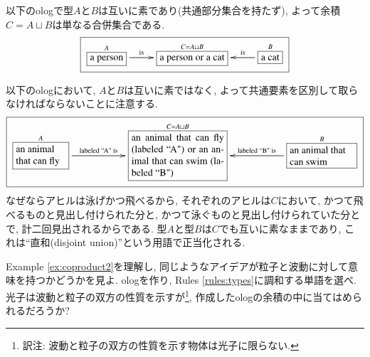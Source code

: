 \begin{example}\label{ex:coproduct1}


以下のologで型$A$と$B$は互いに素であり(共通部分集合を持たず), よって余積$C=A\sqcup B$は単なる合併集合である. $$\fbox{\xymatrix{\smbox{A}{a person}\LA{r}{is}&\smbox{C=A\sqcup B}{a person or a cat}&\smbox{B}{a cat}\LAL{l}{is}}}$$
\end{example}

\begin{example}\label{ex:coproduct2}


以下のologにおいて, $A$と$B$は互いに素ではなく, よって共通要素を区別して取らなければならないことに注意する. $$\fbox{\xymatrixnocompile{\obox{A}{.7in}{\rr an animal that can fly}\LA{rr}{labeled ``A" is}&&\obox{C=A\sqcup B}{1.3in}{an animal that can fly (labeled ``A") or an animal that can swim (labeled ``B")}&&\obox{B}{.9in}{\rr an animal that can swim}\LAL{ll}{labeled ``B" is}}}$$ なぜならアヒルは泳げかつ飛べるから, それぞれのアヒルは$C$において, かつて飛べるものと見出し付けられた分と, かつて泳ぐものと見出し付けられていた分とで, 計二回見出されるからである. 型$A$と型$B$は$C$でも互いに素なままであり, これは``直和(disjoint union)''という用語で正当化される.

\end{example}

\begin{exercise}


Example \ref{ex:coproduct2}を理解し, 同じようなアイデアが粒子と波動に対して意味を持つかどうかを見よ. ologを作り, Rules \ref{rules:types}に調和する単語を選べ. 光子は波動と粒子の双方の性質を示すが\footnote{訳注: 波動と粒子の双方の性質を示す物体は光子に限らない.}, 作成したologの余積の中に当てはめられるだろうか?

\end{exercise}

